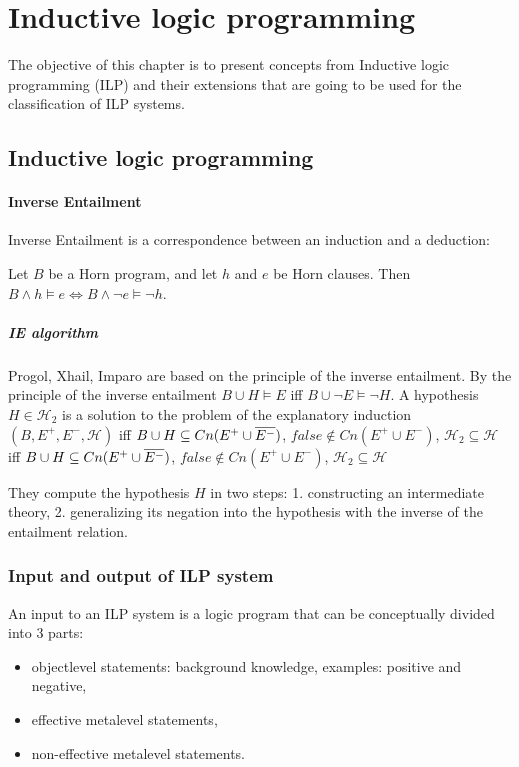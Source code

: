 \chapter{Inductive logic programming}
The objective of this chapter is to present concepts from Inductive logic programming (ILP) and their extensions that are going to be used for the classification of ILP systems.

\section{Inductive logic programming}

\subsubsection{Inverse Entailment}
Inverse Entailment is a correspondence between an induction and a deduction:
\begin{thm}\cite{kimber2012learning}
Let $B$ be a Horn program, and let $h$ and $e$ be
Horn clauses. Then $B \wedge h \models e \iff B \wedge \neg e \models \neg h$.
\end{thm}

\paragraph{IE algorithm\cite{yamamoto2012inverse}}\label{inverse_entailement_algorithm}
Progol, Xhail, Imparo are based on the principle of the inverse entailment. By the principle of the inverse entailment $B \cup H \models E$ iff
$B \cup \neg E \models \neg H$. A hypothesis $H \in \mathcal{H}_2$ is a solution to the problem of the explanatory induction $(B,E^{+},E^{-},\mathcal{H})$ iff
$B \cup H \subseteq Cn(E^{+} \cup \overline{E^{-}})$,
 $false \not\in Cn(E^{+} \cup E^{-})$, $\mathcal{H}_2 \subseteq \mathcal{H}$
iff
$B \cup H \subseteq Cn(E^{+} \cup \overline{E^{-}})$,
 $false \not\in Cn(E^{+} \cup E^{-})$, $\mathcal{H}_2 \subseteq \mathcal{H}$
 
They compute the hypothesis $H$ in two steps:
1. constructing an intermediate theory, 2. generalizing its negation into the hypothesis with the inverse of the entailment relation.


\subsection{Input and output of ILP system}
An input to an ILP system is a logic program that can be conceptually divided into 3 parts:
\begin{itemize}
\item objectlevel statements: background knowledge, examples: positive and negative,
\item effective metalevel statements,
\item non-effective metalevel statements.
\end{itemize}

